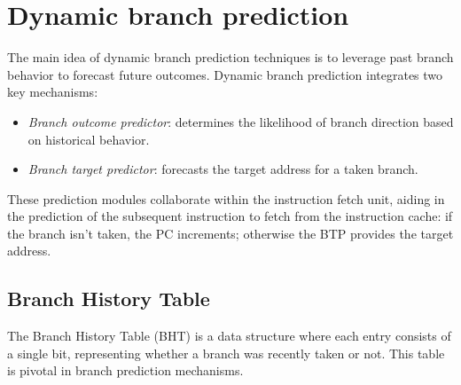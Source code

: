 \section{Dynamic branch prediction}

The main idea of dynamic branch prediction techniques is to leverage past branch behavior to forecast future outcomes.
Dynamic branch prediction integrates two key mechanisms:
\begin{itemize}
    \item \textit{Branch outcome predictor}: determines the likelihood of branch direction based on historical behavior.
    \item \textit{Branch target predictor}: forecasts the target address for a taken branch.
\end{itemize}
These prediction modules collaborate within the instruction fetch unit, aiding in the prediction of the subsequent instruction to fetch from the instruction cache:
if the branch isn't taken, the PC increments; otherwise the BTP provides the target address.

\subsection{Branch History Table}
The Branch History Table (BHT) is a data structure where each entry consists of a single bit, representing whether a branch was recently taken or not. 
This table is pivotal in branch prediction mechanisms.

